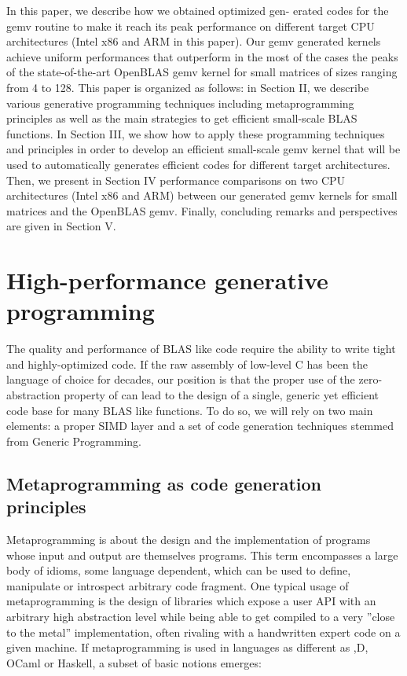 \documentclass[../main]{subfiles}
\begin{document}
In this paper, we describe how we obtained optimized gen-
erated \cpp codes for the gemv routine to make it reach its
peak performance on different target CPU architectures (Intel
x86 and ARM in this paper). Our gemv \cpp generated kernels
achieve uniform performances that outperform in the most of
the cases the peaks of the state-of-the-art OpenBLAS gemv
kernel for small matrices of sizes ranging from 4 to 128.
This paper is organized as follows: in Section II, we describe
various generative programming techniques including metaprogramming
principles as well as the main strategies to get
efficient small-scale BLAS functions. In Section III, we show
how to apply these programming techniques and principles
in order to develop an efficient small-scale gemv kernel that
will be used to automatically generates efficient \cpp codes for
different target architectures. Then, we present in Section IV
performance comparisons on two CPU architectures (Intel
x86 and ARM) between our generated gemv kernels for
small matrices and the OpenBLAS gemv. Finally, concluding
remarks and perspectives are given in Section V.

\section{
  High-performance generative programming
}

The quality and performance of BLAS like code require
the ability to write tight and highly-optimized code. If the
raw assembly of low-level C has been the language of choice
for decades, our position is that the proper use of the zero-
abstraction property of \cpp can lead to the design of a single,
generic yet efficient code base for many BLAS like functions.
To do so, we will rely on two main elements: a proper \cpp
SIMD layer and a set of code generation techniques stemmed
from Generic Programming.

\subsection{
  Metaprogramming as code generation principles
}

Metaprogramming\cite{hpcs7} is about the design and the
implementation of programs whose input and output
are themselves programs. This term encompasses a large
body of idioms, some language dependent, which can be used
to define, manipulate or introspect arbitrary code fragment.
One typical usage of metaprogramming is the design of
libraries which expose a user API with an arbitrary high
abstraction level while being able to get compiled to a very
”close to the metal” implementation, often rivaling with a
handwritten expert code on a given machine\cite{hpcs8}.
If metaprogramming is used in languages as different as
\cpp\cite{hpcs9},D\cite{hpcs10}, OCaml\cite{hpcs11}
or Haskell\cite{hpcs12}, a subset of
basic notions emerges:
\end{document}
